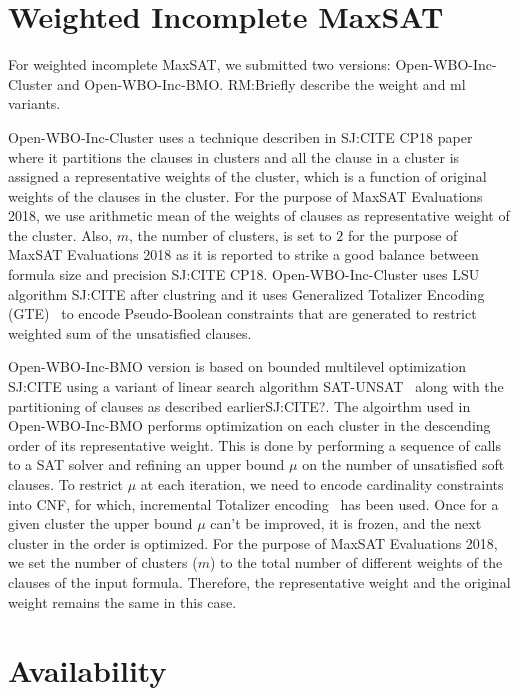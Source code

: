 \documentclass[conference]{IEEEtran}
\newcommand{\sjcomment}[1]{\textcolor{sjcolor}{SJ:#1}}
\newcommand{\rmcomment}[1]{\textcolor{rmcolor}{RM:#1}}
\newcommand{\weight}{\textsf{Open-WBO-Inc-Cluster}\xspace}
\newcommand{\ml}{\textsf{Open-WBO-Inc-BMO}\xspace}
\begin{document}
\section{Weighted Incomplete MaxSAT}

For weighted incomplete MaxSAT, we submitted two versions: \weight and \ml. \rmcomment{Briefly describe the weight and ml variants.}

\weight uses a technique describen in \sjcomment{CITE CP18
paper} where it partitions the clauses in clusters and
all the clause in a cluster is assigned a representative
weights of the cluster, which is a function of original
weights of the clauses in the cluster. For the purpose of
MaxSAT Evaluations 2018,
we use arithmetic mean of the weights of clauses as representative weight of the
cluster. Also, $m$, the number of clusters, is set to $2$ for the purpose of MaxSAT
Evaluations 2018 as it is reported to  strike a good balance
between formula size and precision \sjcomment{CITE CP18}.
\weight uses LSU algorithm \sjcomment{CITE} after clustring
and it uses Generalized Totalizer Encoding
(GTE)~\cite{joshi-cp15} to encode Pseudo-Boolean constraints that
are generated to restrict weighted sum of the unsatisfied
clauses.




\ml version is based on bounded multilevel optimization
\sjcomment{CITE} using a variant of linear search algorithm
SAT-UNSAT~\cite{berre-jsat10} along with the partitioning
of clauses as described earlier\sjcomment{CITE?}. The
algoirthm used in \ml performs optimization on each cluster
in the descending order of its representative weight. This
is done by performing a sequence of calls to a SAT solver
and refining an upper bound $\mu$ on the number of
unsatisfied soft clauses. To restrict $\mu$ at each
iteration, we need to encode  cardinality constraints into
CNF, for which, incremental Totalizer
encoding~\cite{martins-cp14} has been used. Once for a given
cluster the upper bound $\mu$ can't be improved, it is
frozen, and the next cluster in the order is optimized. For
the purpose of MaxSAT Evaluations 2018, we set the number of
clusters ($m$) to the total number of different weights of
the clauses of the input formula. Therefore, the
representative weight and the original weight remains the
same in this case.
 

\section{Availability}
\end{document}
